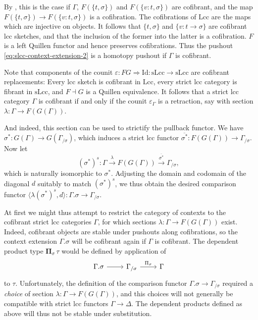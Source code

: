 \documentclass[a4paper]{article}
\theoremstyle{remark}
\theoremstyle{definition}
\begin{document}
By \cite[Proposition A.2.4.4]{higher-topos-theory}, this is the case if $\Gamma$, $F(\{t, \sigma\})$ and $F(\{v : t, \sigma\})$ are cofibrant, and the map $F(\{t, \sigma\}) \rightarrow F(\{v : t, \sigma\})$ is a cofibration.
The cofibrations of $\mathrm{Lcc}$ are the maps which are injective on objects.
It follows that $\{t, \sigma\}$ and $\{ v : t \rightarrow \sigma\}$ are cofibrant lcc sketches, and that the inclusion of the former into the latter is a cofibration.
$F$ is a left Quillen functor and hence preserves cofibrations.
Thus the pushout \eqref{eq:slcc-context-extension-2} is a homotopy pushout if $\Gamma$ is cofibrant.

Note that components of the counit $\varepsilon : FG \Rightarrow \mathrm{Id} : \mathrm{sLcc} \rightarrow \mathrm{sLcc}$ are cofibrant replacements:
Every lcc sketch is cofibrant in $\mathrm{Lcc}$, every strict lcc category is fibrant in $\mathrm{sLcc}$, and $F \dashv G$ is a Quillen equivalence.
It follows that a strict lcc category $\Gamma$ is cofibrant if and only if the counit $\varepsilon_\Gamma$ is a retraction, say with section $\lambda : \Gamma \rightarrow F(G(\Gamma))$.

And indeed, this section can be used to strictify the pullback functor.
We have $\sigma^* : G(\Gamma) \rightarrow G(\Gamma_{/ \sigma})$, which induces a strict lcc functor $\overline{\sigma^*} : F(G(\Gamma)) \rightarrow \Gamma_{/ \sigma}$.
Now let
\begin{equation}
  (\sigma^*)^s : \Gamma \xrightarrow{\lambda} F(G(\Gamma)) \xrightarrow{\overline{\sigma^*}} \Gamma_{/ \sigma},
\end{equation}
which is naturally isomorphic to $\sigma^*$.
Adjusting the domain and codomain of the diagonal $d$ suitably to match $(\sigma^*)^s$, we thus obtain the desired comparison functor $\langle \lambda (\sigma^*)^s, d \rangle : \Gamma.\sigma \rightarrow \Gamma_{/ \sigma}$.

At first we might thus attempt to restrict the category of contexts to the cofibrant strict lcc categories $\Gamma$, for which sections $\lambda : \Gamma \rightarrow F(G(\Gamma))$ exist.
Indeed, cofibrant objects are stable under pushouts along cofibrations, so the context extension $\Gamma.\sigma$ will be cofibrant again if $\Gamma$ is cofibrant.
The dependent product type $\mathbf{\Pi}_\sigma \, \tau$ would be defined by application of
\begin{equation}
  \begin{tikzcd}
    \Gamma.\sigma \arrow[r] & \Gamma_{/ \sigma} \arrow[r, "\Pi_\sigma"] & \Gamma
  \end{tikzcd}
\end{equation}
to $\tau$.
Unfortunately, the definition of the comparison functor $\Gamma.\sigma \rightarrow \Gamma_{/ \sigma}$ required a \emph{choice} of section $\lambda : \Gamma \rightarrow F(G(\Gamma))$, and this choices will not generally be compatible with strict lcc functors $\Gamma \rightarrow \Delta$.
The dependent products defined as above will thus not be stable under substitution.
\end{document}
